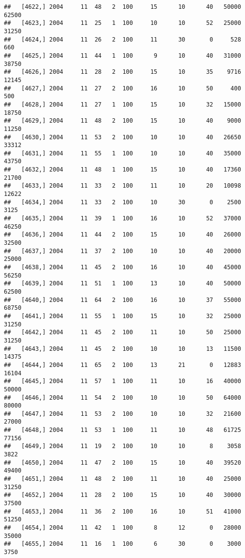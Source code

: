 \documentclass{article}\usepackage[]{graphicx}\usepackage[]{color}
\makeatletter
\newenvironment{kframe}{%
 \def\at@end@of@kframe{}%
 \ifinner\ifhmode%
  \def\at@end@of@kframe{\end{minipage}}%
  \begin{minipage}{\columnwidth}%
 \fi\fi%
 \def\FrameCommand##1{\hskip\@totalleftmargin \hskip-\fboxsep
 \colorbox{shadecolor}{##1}\hskip-\fboxsep
     \hskip-\linewidth \hskip-\@totalleftmargin \hskip\columnwidth}%
 \MakeFramed {\advance\hsize-\width
   \@totalleftmargin\z@ \linewidth\hsize
   \@setminipage}}%
 {\par\unskip\endMakeFramed%
 \at@end@of@kframe}
\newenvironment{knitrout}{}{} %
\makeatother
\begin{document}
\begin{knitrout}
\begin{kframe}
\begin{verbatim}
##   [4622,] 2004     11  48   2  100     15      10      40   50000   62500
##   [4623,] 2004     11  25   1  100     10      10      52   25000   31250
##   [4624,] 2004     11  26   2  100     11      30       0     528     660
##   [4625,] 2004     11  44   1  100      9      10      40   31000   38750
##   [4626,] 2004     11  28   2  100     15      10      35    9716   12145
##   [4627,] 2004     11  27   2  100     16      10      50     400     500
##   [4628,] 2004     11  27   1  100     15      10      32   15000   18750
##   [4629,] 2004     11  48   2  100     15      10      40    9000   11250
##   [4630,] 2004     11  53   2  100     10      10      40   26650   33312
##   [4631,] 2004     11  55   1  100     10      10      40   35000   43750
##   [4632,] 2004     11  48   1  100     15      10      40   17360   21700
##   [4633,] 2004     11  33   2  100     11      10      20   10098   12622
##   [4634,] 2004     11  33   2  100     10      30       0    2500    3125
##   [4635,] 2004     11  39   1  100     16      10      52   37000   46250
##   [4636,] 2004     11  44   2  100     15      10      40   26000   32500
##   [4637,] 2004     11  37   2  100     10      10      40   20000   25000
##   [4638,] 2004     11  45   2  100     16      10      40   45000   56250
##   [4639,] 2004     11  51   1  100     13      10      40   50000   62500
##   [4640,] 2004     11  64   2  100     16      10      37   55000   68750
##   [4641,] 2004     11  55   1  100     15      10      32   25000   31250
##   [4642,] 2004     11  45   2  100     11      10      50   25000   31250
##   [4643,] 2004     11  45   2  100     10      10      13   11500   14375
##   [4644,] 2004     11  65   2  100     13      21       0   12883   16104
##   [4645,] 2004     11  57   1  100     11      10      16   40000   50000
##   [4646,] 2004     11  54   2  100     10      10      50   64000   80000
##   [4647,] 2004     11  53   2  100     10      10      32   21600   27000
##   [4648,] 2004     11  53   1  100     11      10      48   61725   77156
##   [4649,] 2004     11  19   2  100     10      10       8    3058    3822
##   [4650,] 2004     11  47   2  100     15      10      40   39520   49400
##   [4651,] 2004     11  48   2  100     11      10      40   25000   31250
##   [4652,] 2004     11  28   2  100     15      10      40   30000   37500
##   [4653,] 2004     11  36   2  100     16      10      51   41000   51250
##   [4654,] 2004     11  42   1  100      8      12       0   28000   35000
##   [4655,] 2004     11  16   1  100      6      30       0    3000    3750

\end{verbatim}
\end{kframe}
\end{knitrout}
\end{document}
